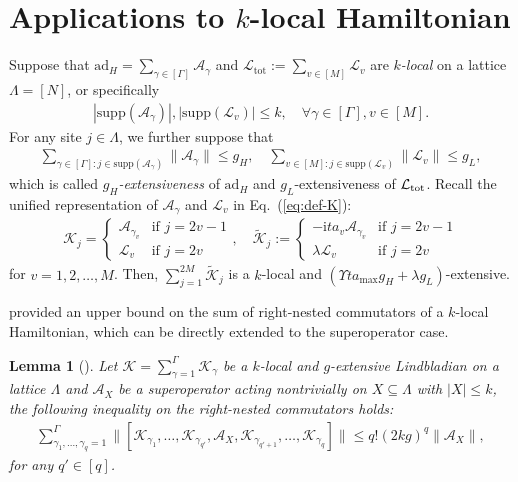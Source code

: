 \documentclass[11pt]{article}
\newtheorem{lemma}{Lemma}
\newcommand{\eq}[1]{(\ref{eq:#1})}
\renewcommand{\i}{\mathrm{i}}
\renewcommand{\L}{\mathcal{L}}
\newcommand{\ad}{\mathrm{ad}}
\newcommand{\A}{\mathcal{A}}
\newcommand{\tot}{\mathrm{tot}}
\newcommand{\supp}{\mathrm{supp}}
\newcommand{\mc}{\mathcal}
\begin{document}
\section{Applications to $k$-local Hamiltonian}
\label{sec:local}
Suppose that $\ad_H=\sum_{\gamma\in[\Gamma]}\A_\gamma$ and $\mc L_{\tot}:=\sum_{v\in [M]}\mc L_v$ are \emph{$k$-local} on a lattice $\Lambda = [N]$, or specifically \begin{align*}
    |\supp(\A_{\gamma})|, |\supp(\L_v)|\le k, \quad \forall \gamma\in [\Gamma], v\in [M].
\end{align*} For any site $j\in \Lambda$, we further suppose that \begin{align*}
    \sum_{\gamma\in [\Gamma]: j\in \supp(\A_{\gamma})}\|\A_\gamma\|\le g_H, \quad \sum_{v\in [M]: j\in \supp(\L_{v})}\|\L_v\|\le g_L,
\end{align*}
which is called \emph{$g_H$-extensiveness} of $\ad_H$ and $g_L$-extensiveness of $\L_{\rm tot}$.
Recall the unified representation of $\mc A_{\gamma}$ and $\mc L_v$ in Eq.~\eq{def-K}: \begin{align*}
    \mathcal{K}_j = \begin{cases}\mathcal{A}_{\gamma_v} & \text{if } j = 2v-1 \\ \mathcal{L}_v & \text{if } j = 2v \end{cases}, \quad \tilde{\mathcal{K}}_j := \begin{cases}-\i ta_{v}\mathcal{A}_{\gamma_v} & \text{if } j = 2v-1\\ \lambda\mathcal{L}_v & \text{if } j = 2v \end{cases} 
\end{align*}
for $v=1, 2,\ldots, M$. Then, $\sum_{j=1}^{2M} \tilde{\mc K}_j$ is a $k$-local and $(\Upsilon t a_{\max}g_H+\lambda g_L)$-extensive. 

\citet{mizuta2025commutator} provided an upper bound on the sum of right-nested commutators of a $k$-local Hamiltonian, which can be directly extended to the superoperator case. 
\begin{lemma}[{\cite[Lemma~7]{mizuta2025commutator}}]
\label{lem:commu-bound}
    Let $\mc K = \sum_{\gamma=1}^{\Gamma} \mc K_{\gamma}$ be a $k$-local and $g$-extensive Lindbladian on a lattice $\Lambda$ and $\mc A_X$ be a superoperator acting nontrivially on $X\subseteq \Lambda$ with $|X|\le k$, the following inequality on the right-nested commutators holds: \begin{align*}
        \sum_{\gamma_1, \ldots, \gamma_q=1}^{\Gamma} \big\|[\mc K_{\gamma_1}, \ldots, \mc K_{\gamma_{q'}}, \mc A_X, \mc K_{\gamma_{q'+1}}, \ldots, \mc K_{\gamma_q}]\big\|\le q!(2kg)^q\|\mc A_X\|,
    \end{align*}
    for any $q'\in[q]$.
\end{lemma}
\end{document}
